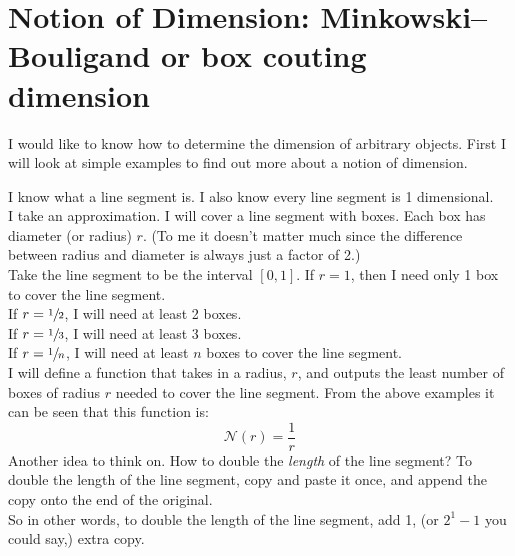 \documentclass[11pt]{ekblite}
\begin{document}
\section{Notion of Dimension: Minkowski–Bouligand or box couting dimension}
I would like to know how to determine the dimension of arbitrary objects. First I will look at simple examples to find out more about a notion of dimension.
\begin{example}
	I know what a line segment is. I also know every line segment is 1 dimensional.
	\\[0.2in]I take an approximation. I will cover a line segment with boxes. Each box has diameter (or radius) $r$. (To me it doesn't matter much since the difference between radius and diameter is always just a factor of 2.)
	\\[0.2in]Take the line segment to be the interval $[0,1]$. If $r = 1$, then I need only 1 box to cover the line segment.
	\\[0.2in]If $r = \sfrac{1}{2}$, I will need at least 2 boxes.
	\\[0.2in]If $r = \sfrac{1}{3}$, I will need at least 3 boxes.
	\\[0.2in]If $r = \sfrac{1}{n}$, I will need at least $n$ boxes to cover the line segment.
	\\[0.2in]I will define a function that takes in a radius, $r$, and outputs the least number of boxes of radius $r$ needed to cover the line segment. From the above examples it can be seen that this function is:
	\[\mathcal{N}(r) = \frac{1}{r}\]
	Another idea to think on. How to double the \textit{length} of the line segment? To double the length of the line segment, copy and paste it once, and append the copy onto the end of the original. 
	\\[0.2in]So in other words, to double the length of the line segment, add 1, (or $2^1 - 1$ you could say,) extra copy.
\end{example}
\end{document}
